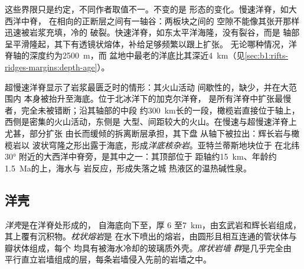 这些界限只是约定，不同作者取值不一。不变的是
形态的变化。慢速洋脊，如大西洋中脊，
在相向的正断层之间有一轴谷：两板块之间的
空隙不能像其张开那样迅速被岩浆充填，冷的
破裂。快速洋脊，如东太平洋海隆，没有裂谷，而是
轴部呈平滑隆起，其下有透镜状熔体，补给足够频繁以跟上扩张。
无论哪种情况，洋脊轴的深度约为\qty{2500}{m}，而
盆地中最老的洋底比其深近\qty{4}{km}（见\cref{sec:b1:rifts-ridges-margins:depth-age}）。

超慢速洋脊显示了岩浆最匮乏时的情形：其火山活动
间歇性的，缺少，并在大范围内
本身被抬升至海底。位于北冰洋下的加克尔洋脊，
是所有洋脊中扩张最慢者，完全未被错断；沿其轴部的中段
约\qty{300}{km}长的一段，橄榄岩直接位于轴上，
西侧是密集的火山活动，东侧是
大型、间距较大的火山。在慢速与超慢速洋脊上尤甚，部分扩张
由长而缓倾的拆离断层承担，其下盘
从轴下被拉出：辉长岩与橄榄岩以
波状穹隆之形出露于海底，形成\emph{洋底核杂岩}。亚特兰蒂斯地块位于
在北纬 \ang{30} 附近的大西洋中脊旁，是其中之一：其顶部位于
距轴约\qty{15}{km}、年龄约\qty{1.5}{Ma}的上，海水与
岩反应，形成失落之城
热液区的温热碱性泉。

\subsection*{洋壳}

\begin{definition}[洋壳、枕状熔岩与席状岩墙群]\label{def:b1:rifts-ridges-margins:oceanic-crust}
\emph{洋壳}是在洋脊处形成的，
自海底向下至，厚 6 至\qty{7}{km}，由玄武岩和辉长岩组成，
其上覆有沉积物。\emph{枕状熔岩}是
在水下喷出的熔岩，由圆形且相互连通的管状体与瓣状体组成，每个
均具有被海水冷却的玻璃质外壳。\emph{席状岩墙
群}是几乎完全由
平行直立岩墙组成的层，每条岩墙侵入先前的岩墙之中。
\end{definition}

